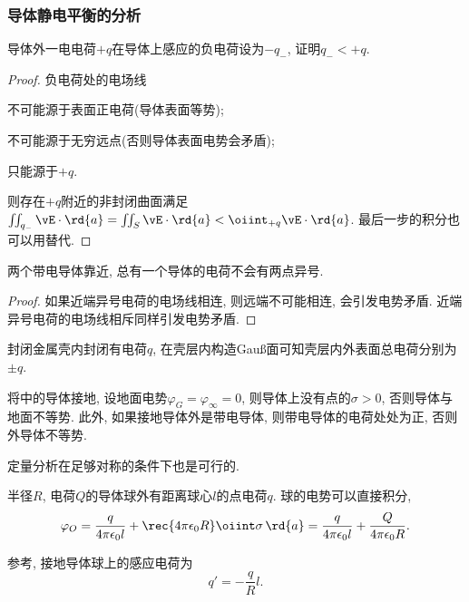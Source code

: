 \documentclass[../Electromagnetism.tex]{subfiles}
\begin{document}

\subsubsection{导体静电平衡的分析} %
\label{ssub:导体静电平衡的分析}

\begin{ex}
	\label{ex:点电荷在导体上感应}
	导体外一电电荷$+q$在导体上感应的负电荷设为$-q_{-}$, 证明$q_{-}<+q$.
\end{ex}
\begin{proof}
	负电荷处的电场线
	\begin{cenum}
		\item 不可能源于表面正电荷(导体表面等势);
		\item 不可能源于无穷远点(否则导体表面电势会矛盾);
		\item 只能源于$+q$.
	\end{cenum}
	则存在$+q$附近的非封闭曲面满足$\iint_{q_{-}} \vE\cdot\rd{a} = \iint_{S} \vE\cdot\rd{a} < \oiint_{+q} \vE\cdot\rd{a}$. 最后一步的积分也可以用替代.
\end{proof}
\begin{ex}
	两个带电导体靠近, 总有一个导体的电荷不会有两点异号.
\end{ex}
\begin{proof}
	如果近端异号电荷的电场线相连, 则远端不可能相连, 会引发电势矛盾. 近端异号电荷的电场线相斥同样引发电势矛盾.
\end{proof}
\begin{ex}
	\label{ex:封闭金属壳外表面总电荷}
	封闭金属壳内封闭有电荷$q$, 在壳层内构造Gau\ss 面可知壳层内外表面总电荷分别为$\pm q$.
\end{ex}
\begin{ex}
	\label{ex:导体外有点电荷的接地导体的表面电荷密度}
	将中的导体接地, 设地面电势$\varphi_G = \varphi_\infty = 0$, 则导体上没有点的$\sigma > 0$, 否则导体与地面不等势. 此外, 如果接地导体外是带电导体, 则带电导体的电荷处处为正, 否则外导体不等势.
\end{ex}
定量分析在足够对称的条件下也是可行的.
\begin{ex}
	\label{ex:球外有点电荷的导体球的电势}
	半径$R$, 电荷$Q$的导体球外有距离球心$l$的点电荷$q$. 球的电势可以直接积分,
	\[ \varphi_O = \frac{q}{4\pi\epsilon_0 l} + \rec{4\pi\epsilon_0 R}\oiint \sigma\,\rd{a} = \frac{q}{4\pi\epsilon_0 l} + \frac{Q}{4\pi\epsilon_0 R}. \]
\end{ex}
\begin{ex}
	参考, 接地导体球上的感应电荷为
	\[ q' = -\frac{q}{R}{l}. \]
\end{ex}
\end{document}
